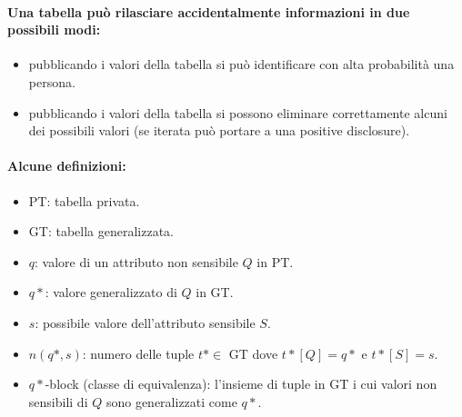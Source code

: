 \paragraph{Una tabella può rilasciare accidentalmente informazioni in due possibili modi:}

\begin{itemize}
  \item {} pubblicando i valori della tabella si può identificare con alta probabilità una persona.
  \item {} pubblicando i valori della tabella si possono eliminare correttamente alcuni dei possibili valori (se iterata può portare a una positive disclosure).
\end{itemize}

\paragraph{Alcune definizioni:}

\begin{itemize}
  \item PT: tabella privata. 
  \item GT: tabella generalizzata. 
  \item $q$: valore di un attributo non sensibile $Q$ in PT. 
  \item $q*$: valore generalizzato di $Q$ in GT. 
  \item $s$: possibile valore dell'attributo sensibile $S$. 
  \item $n(q*, s)$: numero delle tuple $t* \in$ GT dove $t*[Q] = q*$ e $t*[S] = s$. 
  \item $q*$-block (classe di equivalenza): l'insieme di tuple in GT i cui valori non sensibili di $Q$ sono generalizzati come $q*$.
\end{itemize}




